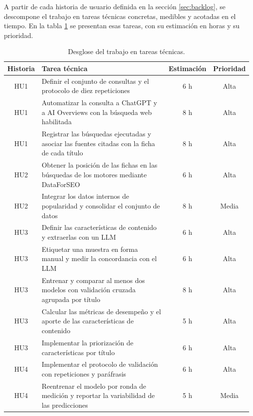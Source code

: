 \documentclass[
11pt, %
codirector, %
]{charter}
\begin{document}
A partir de cada historia de usuario definida en la sección \ref{sec:backlog}, se descompone el trabajo en tareas técnicas concretas, medibles y acotadas en el tiempo. En la tabla \ref{tab:wbs} se presentan esas tareas, con su estimación en horas y su prioridad.
\begin{table}[htpb]
\centering
\caption{Desglose del trabajo en tareas técnicas.}
\label{tab:wbs}
\begin{tabularx}{\linewidth}{@{}|c|>{\raggedright\arraybackslash}X|c|c|@{}}
\hline
\rowcolor[HTML]{C0C0C0}
Historia & Tarea técnica & Estimación & Prioridad \\ \hline
HU1 & Definir el conjunto de consultas y el protocolo de diez repeticiones & 6 h & Alta \\ \hline
HU1 & Automatizar la consulta a ChatGPT y a AI Overviews con la búsqueda web habilitada & 8 h & Alta \\ \hline
HU1 & Registrar las búsquedas ejecutadas y asociar las fuentes citadas con la ficha de cada título & 8 h & Alta \\ \hline
HU2 & Obtener la posición de las fichas en las búsquedas de los motores mediante DataForSEO & 6 h & Alta \\ \hline
HU2 & Integrar los datos internos de popularidad y consolidar el conjunto de datos & 8 h & Media \\ \hline
HU3 & Definir las características de contenido y extraerlas con un LLM & 6 h & Alta \\ \hline
HU3 & Etiquetar una muestra en forma manual y medir la concordancia con el LLM & 6 h & Alta \\ \hline
HU3 & Entrenar y comparar al menos dos modelos con validación cruzada agrupada por título & 8 h & Alta \\ \hline
HU3 & Calcular las métricas de desempeño y el aporte de las características de contenido & 5 h & Alta \\ \hline
HU3 & Implementar la priorización de características por título & 6 h & Alta \\ \hline
HU4 & Implementar el protocolo de validación con repeticiones y paráfrasis & 6 h & Alta \\ \hline
HU4 & Reentrenar el modelo por ronda de medición y reportar la variabilidad de las predicciones & 5 h & Media \\ \hline
\end{tabularx}
\end{table}
\end{document}
